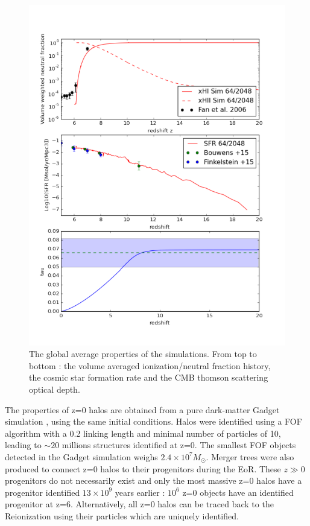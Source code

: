 \documentclass[twocolumn]{aastex61}
\begin{document}
\begin{figure}[ht!]
\includegraphics[height=1.10\columnwidth, width=0.94\columnwidth]{img/x_sfr_tau.pdf}
\caption{The global average properties of the simulations. From top to bottom : the volume averaged ionization/neutral fraction history, the cosmic star formation rate and the CMB thomson scattering optical depth.}
\label{fig:globpro}
\end{figure}





The properties of z=0 halos are obtained from a pure dark-matter Gadget simulation \citep{SPR5}, using the same initial conditions. %
Halos were identified using a FOF algorithm with a 0.2 linking length and minimal number of particles of 10, leading to $\sim 20$ millions structures identified at z=0. The smallest FOF objects detected in the Gadget simulation weighs $2.4\times 10^7 M_\odot$. Merger trees were also produced to connect z=0 halos to their progenitors during the EoR. These $z\gg 0$ progenitors do not necessarily exist and only the most massive z=0 halos have a progenitor identified $13\times 10^9$ years earlier : $10^6$  z=0 objects have an identified progenitor at z=6. Alternatively, all z=0 halos can be traced back to the Reionization using their particles which are uniquely identified. 
\end{document}
